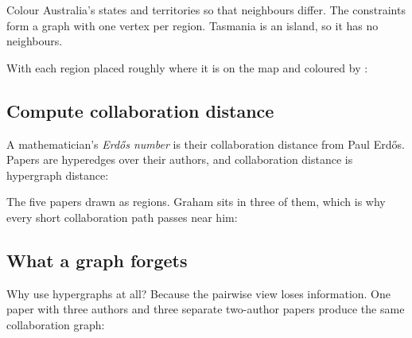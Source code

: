 Colour Australia's states and territories so that neighbours differ. The
constraints form a graph with one vertex per region. Tasmania is an island, so
it has no neighbours.

\begin{codepairs}
\end{codepairs}

With each region placed roughly where it is on the map and coloured by
:



\subsection*{Compute collaboration distance}

A mathematician's \emph{Erd\H{o}s number} is their collaboration distance from
Paul Erd\H{o}s. Papers are hyperedges over their authors, and collaboration
distance is hypergraph distance:

\begin{codepairs}
\end{codepairs}

The five papers drawn as regions. Graham sits in three of them, which is why
every short collaboration path passes near him:



\subsection*{What a graph forgets}

Why use hypergraphs at all? Because the pairwise view loses information. One
paper with three authors and three separate two-author papers produce the same
collaboration graph:

\begin{codepairs}
\end{codepairs}

